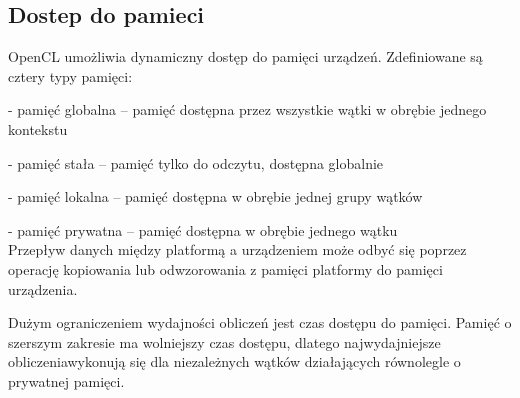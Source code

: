 \subsection{Dostep do pamieci}\label{sec:OpenC6L}

OpenCL umożliwia dynamiczny dostęp do pamięci urządzeń. Zdefiniowane są cztery typy pamięci:

- pamięć globalna – pamięć dostępna przez wszystkie wątki w obrębie jednego kontekstu

- pamięć stała – pamięć tylko do odczytu, dostępna globalnie

- pamięć lokalna – pamięć dostępna w obrębie jednej grupy wątków

- pamięć prywatna – pamięć dostępna w obrębie jednego wątku\\


 Przepływ danych między platformą  a urządzeniem może odbyć się poprzez operację kopiowania  lub odwzorowania z pamięci platformy do pamięci urządzenia.

Dużym ograniczeniem wydajności obliczeń jest czas dostępu do pamięci. Pamięć o szerszym zakresie ma wolniejszy czas dostępu, dlatego najwydajniejsze obliczeniawykonują się dla niezależnych wątków działających równolegle o prywatnej pamięci.















